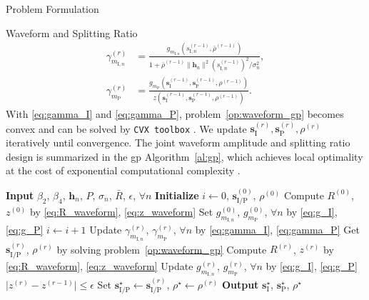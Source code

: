 \begin{section}{Problem Formulation}
\begin{subsection}{Waveform and Splitting Ratio}
		\begin{align}
			\gamma_{m_{\mathrm{I},n}}^{(r)} & = \frac{g_{m_{\mathrm{I},n}}(s_{\mathrm{I},n}^{(r-1)},\bar{\rho}^{(r-1)})}{1+{\bar{\rho}^{(r-1)}\lVert{\mathbf{h}_n}\rVert^2 (s_{\mathrm{I},n}^{(r-1)})^2}\big/{\sigma_n^2}}\label{eq:gamma_I},\\
			\gamma_{m_\mathrm{P}}^{(r)} & = \frac{g_{m_\mathrm{P}}(\mathbf{s}_{\mathrm{I}}^{(r-1)},\mathbf{s}_\mathrm{P}^{(r-1)},\rho^{(r-1)})}{z(\mathbf{s}_{\mathrm{I}}^{(r-1)},\mathbf{s}_\mathrm{P}^{(r-1)},\rho^{(r-1)})}\label{eq:gamma_P}.
		\end{align}
		With \eqref{eq:gamma_I} and \eqref{eq:gamma_P}, problem~\eqref{op:waveform_gp} becomes convex and can be solved by \texttt{CVX toolbox} \cite{Grant2016}. We update $\mathbf{s}_{\mathrm{I}}^{(r)},\mathbf{s}_\mathrm{P}^{(r)},\rho^{(r)}$ iteratively until convergence. The joint waveform amplitude and splitting ratio design is summarized in the \gls{gp} Algorithm~\ref{al:gp}, which achieves local optimality at the cost of exponential computational complexity \cite{Chiang2005}.

		\begin{algorithm}[!t]
			\caption{\gls{gp}: Waveform Amplitude and Splitting Ratio.}
			\label{al:gp}
			\begin{algorithmic}[1]
				\State \textbf{Input} $\beta_2$, $\beta_4$, $\mathbf{h}_n$, $P$, $\sigma_n$, $\bar{R}$, $\epsilon$, $\forall n$
				\State \textbf{Initialize} $i \gets 0$, $\mathbf{s}_{\mathrm{I/P}}^{(0)}$, $\rho^{(0)}$
				\State Compute $R^{(0)}$, $z^{(0)}$ by \eqref{eq:R_waveform}, \eqref{eq:z_waveform}
				\State Set $g_{m_{\mathrm{I},n}}^{(0)}$, $g_{m_\mathrm{P}}^{(0)}$, $\forall n$ by \eqref{eq:g_I}, \eqref{eq:g_P}
				\Repeat
					\State $i \gets i + 1$
					\State Update $\gamma_{m_{\mathrm{I},n}}^{(r)}$, $\gamma_{m_\mathrm{P}}^{(r)}$, $\forall n$ by \eqref{eq:gamma_I}, \eqref{eq:gamma_P}
					\State Get $\mathbf{s}_{\mathrm{I/P}}^{(r)}$, $\rho^{(r)}$ by solving problem~\eqref{op:waveform_gp}
					\State Compute $R^{(r)}$, $z^{(r)}$ by \eqref{eq:R_waveform}, \eqref{eq:z_waveform}
					\State Update $g_{m_{\mathrm{I},n}}^{(r)}$, $g_{m_\mathrm{P}}^{(r)}$, $\forall n$ by \eqref{eq:g_I}, \eqref{eq:g_P}
				\Until $\lvert z^{(r)} - z^{(r-1)} \rvert \le \epsilon$
				\State Set $\mathbf{s}_{\mathrm{I/P}}^{\star} \gets \mathbf{s}_{\mathrm{I/P}}^{(r)}$, $\rho^{\star} \gets \rho^{(r)}$
				\State \textbf{Output} $\mathbf{s}_{\mathrm{I}}^{\star}$, $\mathbf{s}_{\mathrm{P}}^{\star}$, $\rho^{\star}$
			\end{algorithmic}
		\end{algorithm}


\end{subsection}
\end{section}
